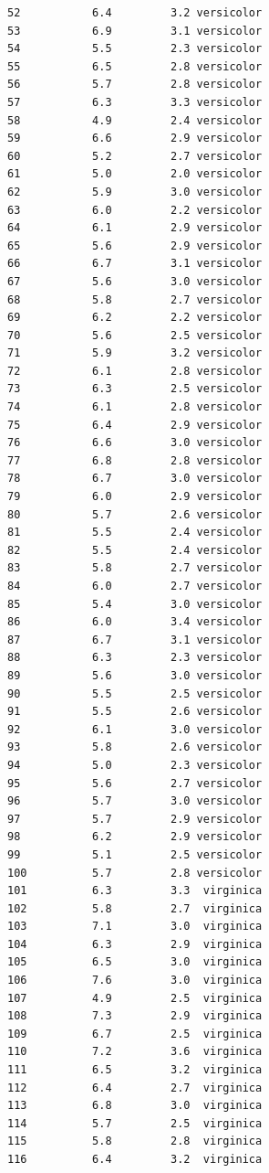 \documentclass[
  a4paper,
]{ltjsbook}
\begin{document}
\begin{verbatim}
52           6.4         3.2 versicolor
53           6.9         3.1 versicolor
54           5.5         2.3 versicolor
55           6.5         2.8 versicolor
56           5.7         2.8 versicolor
57           6.3         3.3 versicolor
58           4.9         2.4 versicolor
59           6.6         2.9 versicolor
60           5.2         2.7 versicolor
61           5.0         2.0 versicolor
62           5.9         3.0 versicolor
63           6.0         2.2 versicolor
64           6.1         2.9 versicolor
65           5.6         2.9 versicolor
66           6.7         3.1 versicolor
67           5.6         3.0 versicolor
68           5.8         2.7 versicolor
69           6.2         2.2 versicolor
70           5.6         2.5 versicolor
71           5.9         3.2 versicolor
72           6.1         2.8 versicolor
73           6.3         2.5 versicolor
74           6.1         2.8 versicolor
75           6.4         2.9 versicolor
76           6.6         3.0 versicolor
77           6.8         2.8 versicolor
78           6.7         3.0 versicolor
79           6.0         2.9 versicolor
80           5.7         2.6 versicolor
81           5.5         2.4 versicolor
82           5.5         2.4 versicolor
83           5.8         2.7 versicolor
84           6.0         2.7 versicolor
85           5.4         3.0 versicolor
86           6.0         3.4 versicolor
87           6.7         3.1 versicolor
88           6.3         2.3 versicolor
89           5.6         3.0 versicolor
90           5.5         2.5 versicolor
91           5.5         2.6 versicolor
92           6.1         3.0 versicolor
93           5.8         2.6 versicolor
94           5.0         2.3 versicolor
95           5.6         2.7 versicolor
96           5.7         3.0 versicolor
97           5.7         2.9 versicolor
98           6.2         2.9 versicolor
99           5.1         2.5 versicolor
100          5.7         2.8 versicolor
101          6.3         3.3  virginica
102          5.8         2.7  virginica
103          7.1         3.0  virginica
104          6.3         2.9  virginica
105          6.5         3.0  virginica
106          7.6         3.0  virginica
107          4.9         2.5  virginica
108          7.3         2.9  virginica
109          6.7         2.5  virginica
110          7.2         3.6  virginica
111          6.5         3.2  virginica
112          6.4         2.7  virginica
113          6.8         3.0  virginica
114          5.7         2.5  virginica
115          5.8         2.8  virginica
116          6.4         3.2  virginica

\end{verbatim}
\end{document}
